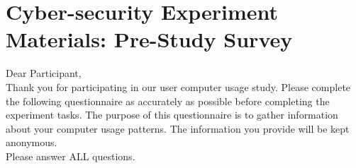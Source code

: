 \documentclass[doctor]{thesis} %
\theoremstyle{plain}
\begin{document}








































%
\backmatter %
\appendix
\chapter{Cyber-security Experiment Materials: Pre-Study Survey}
\label{apx:cypre}
Dear Participant,\\
Thank you for participating in our user computer usage study. Please complete the following questionnaire as accurately as possible before completing the experiment tasks. The purpose of this questionnaire is to gather information about your computer usage patterns. The information you provide will be kept anonymous.\\
Please answer ALL questions.
\end{document}
